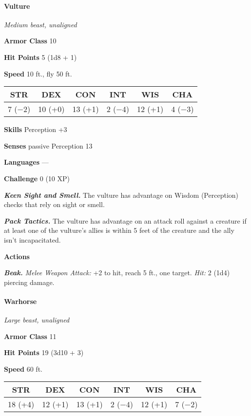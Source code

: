 \documentclass[
]{article}
\begin{document}
\hypertarget{vulture}{%
\paragraph{Vulture}\label{vulture}}

\emph{Medium beast, unaligned}

\textbf{Armor Class} 10

\textbf{Hit Points} 5 (1d8 + 1)

\textbf{Speed} 10 ft., fly 50 ft.

\begin{longtable}[]{@{}cccccc@{}}
\toprule
STR & DEX & CON & INT & WIS & CHA\tabularnewline
\midrule
\endhead
7 (−2) & 10 (+0) & 13 (+1) & 2 (−4) & 12 (+1) & 4 (−3)\tabularnewline
\bottomrule
\end{longtable}

\textbf{Skills} Perception +3

\textbf{Senses} passive Perception 13

\textbf{Languages} ---

\textbf{Challenge} 0 (10 XP)

\emph{\textbf{Keen Sight and Smell.}} The vulture has advantage on
Wisdom (Perception) checks that rely on sight or smell.

\emph{\textbf{Pack Tactics.}} The vulture has advantage on an attack
roll against a creature if at least one of the vulture's allies is
within 5 feet of the creature and the ally isn't incapacitated.

\textbf{Actions}

\emph{\textbf{Beak.}} \emph{Melee Weapon Attack:} +2 to hit, reach 5
ft., one target. \emph{Hit:} 2 (1d4) piercing damage.

\hypertarget{warhorse}{%
\paragraph{Warhorse}\label{warhorse}}

\emph{Large beast, unaligned}

\textbf{Armor Class} 11

\textbf{Hit Points} 19 (3d10 + 3)

\textbf{Speed} 60 ft.

\begin{longtable}[]{@{}cccccc@{}}
\toprule
STR & DEX & CON & INT & WIS & CHA\tabularnewline
\midrule
\endhead
18 (+4) & 12 (+1) & 13 (+1) & 2 (−4) & 12 (+1) & 7 (−2)\tabularnewline
\bottomrule
\end{longtable}
\end{document}
